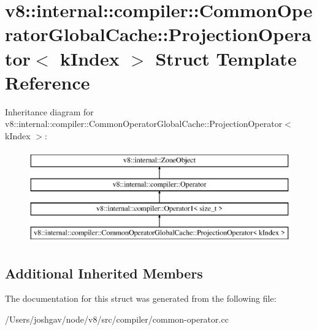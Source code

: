 \hypertarget{structv8_1_1internal_1_1compiler_1_1_common_operator_global_cache_1_1_projection_operator}{}\section{v8\+:\+:internal\+:\+:compiler\+:\+:Common\+Operator\+Global\+Cache\+:\+:Projection\+Operator$<$ k\+Index $>$ Struct Template Reference}
\label{structv8_1_1internal_1_1compiler_1_1_common_operator_global_cache_1_1_projection_operator}
Inheritance diagram for v8\+:\+:internal\+:\+:compiler\+:\+:Common\+Operator\+Global\+Cache\+:\+:Projection\+Operator$<$ k\+Index $>$\+:\begin{figure}[H]
\begin{center}
\leavevmode
\includegraphics[height=4.000000cm]{structv8_1_1internal_1_1compiler_1_1_common_operator_global_cache_1_1_projection_operator}
\end{center}
\end{figure}
\subsection*{Additional Inherited Members}


The documentation for this struct was generated from the following file\+:\begin{DoxyCompactItemize}
\item 
/\+Users/joshgav/node/v8/src/compiler/common-\/operator.\+cc\end{DoxyCompactItemize}
